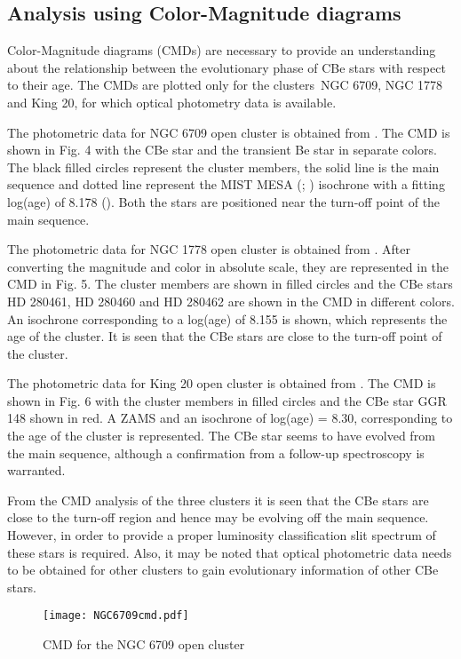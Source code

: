 \documentclass{jaa}
\begin{document}
\subsection{Analysis using Color-Magnitude diagrams}
Color-Magnitude diagrams (CMDs) are necessary to provide an understanding about the relationship between the evolutionary phase of CBe stars with respect to their age. The CMDs are plotted only for the clusters NGC 6709, NGC 1778 and King 20, for which optical photometry data is available.

The photometric data for NGC 6709 open cluster is obtained from \cite{1999Subramaniam}. The CMD is shown in Fig. 4 with the CBe star and the transient Be star in separate colors. The black filled circles represent the cluster members, the solid line is the main sequence and dotted line represent the MIST MESA (\citealt{2016Choi}; \citealt{2016Dotter}) isochrone with a fitting log(age) of 8.178 (\citealt{1999Subramaniam}). Both the stars are positioned near the turn-off point of the main sequence.

The photometric data for NGC 1778 open cluster is obtained from \cite{2017Sampedro}. After converting the magnitude and color in absolute scale, they are represented in the CMD in Fig. 5. The cluster members are shown in filled circles and the CBe stars HD 280461, HD 280460 and HD 280462 are shown in the CMD in different colors. An isochrone corresponding to a log(age) of 8.155 is shown, which represents the age of the cluster. It is seen that the CBe stars are close to the turn-off point of the cluster.

The photometric data for King 20 open cluster is obtained from \cite{2010Glushkova}. The CMD is shown in Fig. 6 with the cluster members in filled circles and the CBe star GGR 148 shown in red. A ZAMS and an isochrone of log(age) = 8.30, corresponding to the age of the cluster is represented. The CBe star seems to have evolved from the main sequence, although a confirmation from a follow-up spectroscopy is warranted.

From the CMD analysis of the three clusters it is seen that the CBe stars are close to the turn-off region and hence may be evolving off the main sequence. However, in order to provide a proper luminosity classification slit spectrum of these stars is required. Also, it may be noted that optical photometric data needs to be obtained for other clusters to gain evolutionary information of other CBe stars.

\begin{figure}
\centering
\texttt{[image: NGC6709cmd.pdf]}
\caption{CMD for the NGC 6709 open cluster} 
\end{figure}
\end{document}
